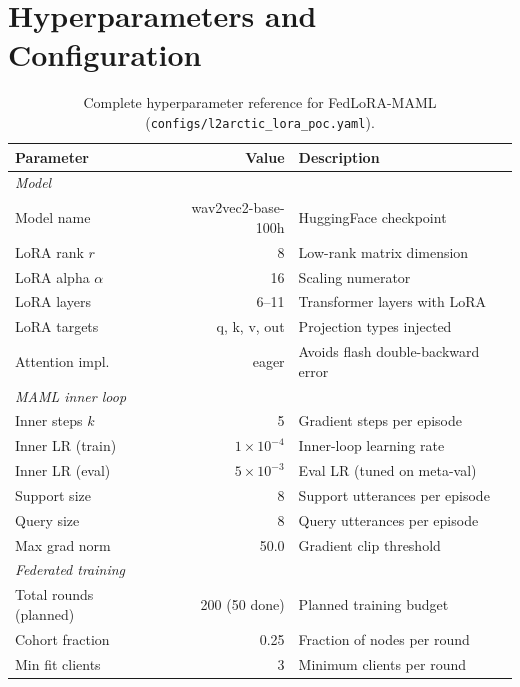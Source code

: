 \documentclass[12pt]{article}
\theoremstyle{plain}
\begin{document}
\section{Hyperparameters and Configuration}
\label{sec:hyperparams}

\begin{table}[H]
\centering
\caption{Complete hyperparameter reference for FedLoRA-MAML
         (\texttt{configs/l2arctic\_lora\_poc.yaml}).}
\label{tab:hyperparams}
\begin{tabular}{p{4.5cm} r p{5.5cm}}
\toprule
\textbf{Parameter} & \textbf{Value} & \textbf{Description} \\
\midrule
\multicolumn{3}{l}{\textit{Model}} \\
Model name             & wav2vec2-base-100h & HuggingFace checkpoint \\
LoRA rank $r$          & 8    & Low-rank matrix dimension \\
LoRA alpha $\alpha$    & 16   & Scaling numerator \\
LoRA layers            & 6--11 & Transformer layers with LoRA \\
LoRA targets           & q, k, v, out & Projection types injected \\
Attention impl.        & eager & Avoids flash double-backward error \\
\midrule
\multicolumn{3}{l}{\textit{MAML inner loop}} \\
Inner steps $k$        & 5             & Gradient steps per episode \\
Inner LR (train)       & $1\times10^{-4}$ & Inner-loop learning rate \\
Inner LR (eval)        & $5\times10^{-3}$ & Eval LR (tuned on meta-val) \\
Support size           & 8             & Support utterances per episode \\
Query size             & 8             & Query utterances per episode \\
Max grad norm          & 50.0          & Gradient clip threshold \\
\midrule
\multicolumn{3}{l}{\textit{Federated training}} \\
Total rounds (planned) & 200 (50 done) & Planned training budget \\
Cohort fraction        & 0.25          & Fraction of nodes per round \\
Min fit clients        & 3             & Minimum clients per round \\

\end{tabular}
\end{table}
\end{document}
